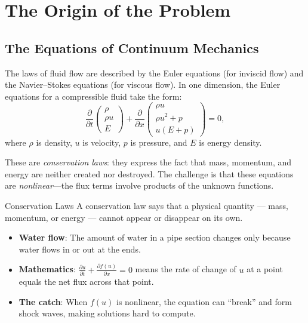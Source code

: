 \section{The Origin of the Problem}

\subsection{The Equations of Continuum Mechanics}

The laws of fluid flow are described by the Euler equations (for inviscid flow) and the Navier--Stokes equations (for viscous flow). In one dimension, the Euler equations for a compressible fluid take the form:
\[
\frac{\partial}{\partial t} \begin{pmatrix} \rho \\ \rho u \\ E \end{pmatrix} + \frac{\partial}{\partial x} \begin{pmatrix} \rho u \\ \rho u^2 + p \\ u(E + p) \end{pmatrix} = 0,
\]
where $\rho$ is density, $u$ is velocity, $p$ is pressure, and $E$ is energy density.

These are \emph{conservation laws}: they express the fact that mass, momentum, and energy are neither created nor destroyed. The challenge is that these equations are \emph{nonlinear}---the flux terms involve products of the unknown functions.

\begin{knowledgebridge}{Conservation Laws}
A conservation law says that a physical quantity --- mass, momentum, or energy --- cannot appear or disappear on its own.
\begin{itemize}
    \item \textbf{Water flow}: The amount of water in a pipe section changes only because water flows in or out at the ends.
    \item \textbf{Mathematics}: $\frac{\partial u}{\partial t} + \frac{\partial f(u)}{\partial x} = 0$ means the rate of change of $u$ at a point equals the net flux across that point.
    \item \textbf{The catch}: When $f(u)$ is nonlinear, the equation can ``break'' and form shock waves, making solutions hard to compute.
\end{itemize}
\end{knowledgebridge}

